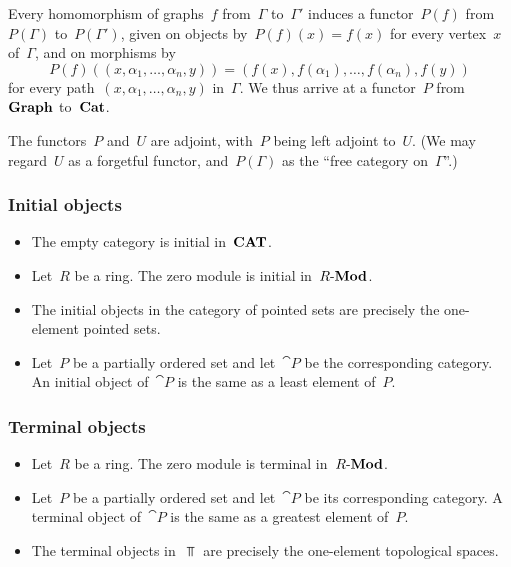 \begin{itemize}
		Every homomorphism of graphs~$f$ from~$Γ$ to~$Γ'$ induces a functor~$P(f)$ from~$P(Γ)$ to~$P(Γ')$, given on objects by~$P(f)(x) = f(x)$ for every vertex~$x$ of~$Γ$, and on morphisms by
		\[
			P(f)( (x, α_1, \dotsc, α_n, y) )
			=
			( f(x), f(α_1), \dotsc, f(α_n), f(y) )
		\]
		for every path~$(x, α_1, \dotsc, α_n, y)$ in~$Γ$.
		We thus arrive at a functor~$P$ from~$\mathbf{Graph}$ to~$\mathbf{Cat}$.

		The functors~$P$ and~$U$ are adjoint, with~$P$ being left adjoint to~$U$.
		(We may regard~$U$ as a forgetful functor, and~$P(Γ)$ as the \enquote{free category on~$Γ$}.)
\end{itemize}



\subsubsection*{Initial objects}

\begin{itemize}

	\item
		The empty category is initial in~$\mathbf{CAT}$.

	\item
		Let~$R$ be a ring.
		The zero module is initial in~$R\text{-}\mathbf{Mod}$.

	\item
		The initial objects in the category of pointed sets are precisely the one-element pointed sets.

	\item
		Let~$P$ be a partially ordered set and let~$\cat{P}$ be the corresponding category.
		An initial object of~$\cat{P}$ is the same as a least element of~$P$.

\end{itemize}



\subsubsection*{Terminal objects}

\begin{itemize}

	\item
		Let~$R$ be a ring.
		The zero module is terminal in~$R\text{-}\mathbf{Mod}$.

	\item
		Let~$P$ be a partially ordered set and let~$\cat{P}$ be its corresponding category.
		A terminal object of~$\cat{P}$ is the same as a greatest element of~$P$.

	\item
		The terminal objects in~$\Top$ are precisely the one-element topological spaces.

\end{itemize}
